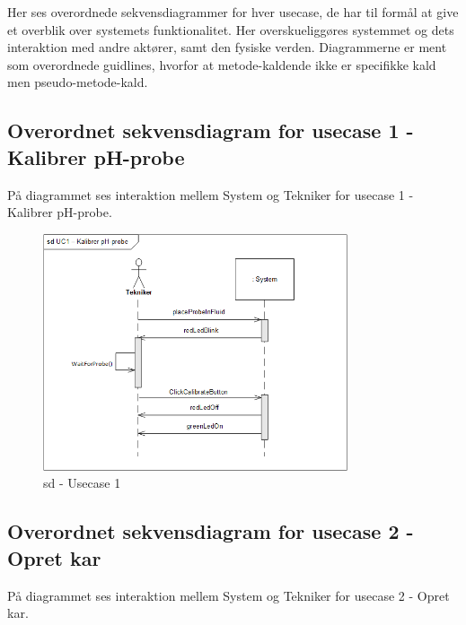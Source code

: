 
Her ses overordnede sekvensdiagrammer for hver usecase, de har til formål at give et overblik over systemets funktionalitet. Her overskueliggøres systemmet og dets interaktion med andre aktører, samt den fysiske verden.
Diagrammerne er ment som overordnede guidlines, hvorfor at metode-kaldende ikke er specifikke kald men pseudo-metode-kald. 

\subsection*{Overordnet sekvensdiagram for usecase 1 - Kalibrer pH-probe}
På diagrammet ses interaktion mellem System og Tekniker for usecase 1 - Kalibrer pH-probe.

\begin{figure}[H]
    \centering
    \includegraphics[width=0.8\textwidth]{Systemarkitektur/OverordnedeSekvensdiagrammer/sd_UC1.PNG}
    \caption{sd - Usecase 1}
    \label{fig:sd_UC1}
\end{figure}

\subsection*{Overordnet sekvensdiagram for usecase 2 - Opret kar}
På diagrammet ses interaktion mellem System og Tekniker for usecase 2 - Opret kar.

